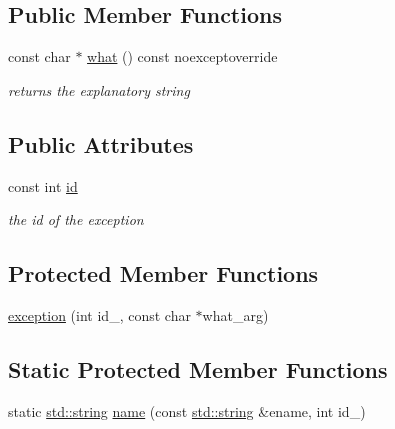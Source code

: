 \subsection*{Public Member Functions}
\begin{DoxyCompactItemize}
\item 
const char $\ast$ \hyperlink{classnlohmann_1_1detail_1_1exception_a56e006c6ac214875115049ae5b9b569a}{what} () const noexceptoverride
\begin{DoxyCompactList}\small\item\em returns the explanatory string \end{DoxyCompactList}\end{DoxyCompactItemize}
\subsection*{Public Attributes}
\begin{DoxyCompactItemize}
\item 
const int \hyperlink{classnlohmann_1_1detail_1_1exception_a0d4589a3fb54e81646d986c05efa3b9a}{id}
\begin{DoxyCompactList}\small\item\em the id of the exception \end{DoxyCompactList}\end{DoxyCompactItemize}
\subsection*{Protected Member Functions}
\begin{DoxyCompactItemize}
\item 
\hyperlink{classnlohmann_1_1detail_1_1exception_ae323ad0d53bc724414c2233164e65657}{exception} (int id\+\_\+, const char $\ast$what\+\_\+arg)
\end{DoxyCompactItemize}
\subsection*{Static Protected Member Functions}
\begin{DoxyCompactItemize}
\item 
static \hyperlink{namespacenlohmann_1_1detail_a1ed8fc6239da25abcaf681d30ace4985ab45cffe084dd3d20d928bee85e7b0f21}{std\+::string} \hyperlink{classnlohmann_1_1detail_1_1exception_abf41a7e9178356314082284e6cfea278}{name} (const \hyperlink{namespacenlohmann_1_1detail_a1ed8fc6239da25abcaf681d30ace4985ab45cffe084dd3d20d928bee85e7b0f21}{std\+::string} \&ename, int id\+\_\+)
\end{DoxyCompactItemize}


